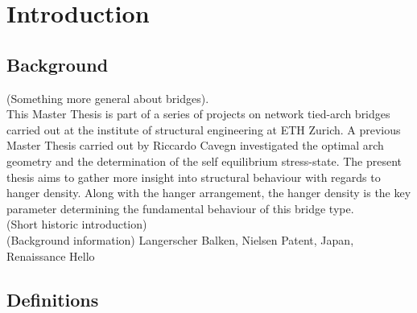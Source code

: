 \section{Introduction}\label{sec:intro}

\subsection{Background}
(Something more general about bridges).\\
This Master Thesis is part of a series of projects on network tied-arch bridges carried out at the institute of structural engineering at ETH Zurich. A previous Master Thesis carried out by Riccardo Cavegn investigated the optimal arch geometry and the determination of the self equilibrium stress-state. The present thesis aims to gather more insight into structural behaviour with regards to hanger density. Along with the hanger arrangement, the hanger density is the key parameter determining the fundamental behaviour of this bridge type.\\
(Short historic introduction)\\
(Background information)
Langerscher Balken, Nielsen Patent, Japan, Renaissance
Hello


\subsection{Definitions}